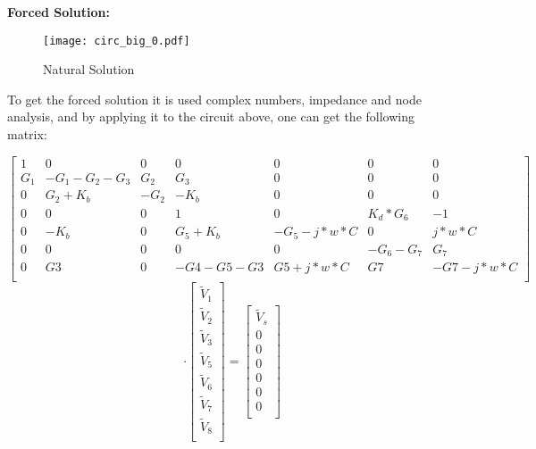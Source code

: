 \vspace{1cm}

\textbf{Forced Solution:}

\begin{figure}[h!]
   \texttt{[image: circ\_big\_0.pdf]}
    \centering
    \caption{Natural Solution}  %
    \label{forced}
\end{figure}

\vspace{1cm}
To get the forced solution it is used complex numbers, impedance and node analysis, and by applying it to the circuit above, one can get the following matrix:



\[
\begin{bmatrix}
1 & 0 & 0 & 0 & 0 & 0 & 0\\
G_1 & -G_1-G_2-G_3 & G_2 & G_3 & 0 & 0 & 0\\
0 & G_2+K_b & -G_2 & -K_b & 0 & 0 & 0\\
0 & 0 & 0 & 1 & 0 & K_d*G_6 & -1\\
0 & -K_b & 0 & G_5+K_b & -G_5-j*w*C & 0 & j*w*C\\
0 & 0 & 0 & 0 & 0 & -G_6-G_7 & G_7\\
0 & G3 & 0 & -G4-G5-G3 & G5+j*w*C & G7 & -G7-j*w*C \\
\end{bmatrix}
\]
\[
\cdot
\begin{bmatrix}
\tilde{V}_1\\
\tilde{V}_2\\
\tilde{V}_3\\
\tilde{V}_5\\
\tilde{V}_6\\
\tilde{V}_7\\
\tilde{V}_8\\
\end{bmatrix}
=
\begin{bmatrix}
\tilde{V}_s\\
0\\
0\\
0\\
0\\
0\\
0\\
\end{bmatrix}
\]



